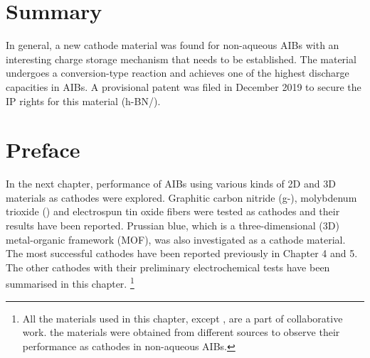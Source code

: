 \section{Summary}
In general, a new cathode material was found for non-aqueous AIBs with an interesting charge storage mechanism that needs to be established. The material undergoes a conversion-type reaction and achieves one of the highest discharge capacities in AIBs. A provisional patent was filed in December 2019 to secure the IP rights for this material (h-BN/).
\newpage
\section*{Preface}
In the next chapter, performance of AIBs using various kinds of 2D and 3D materials as cathodes were explored. Graphitic carbon nitride (g-), molybdenum trioxide () and electrospun tin oxide  fibers were tested as cathodes and their results have been reported. Prussian blue, which is a three-dimensional (3D) metal-organic framework (MOF), was also investigated as a cathode material. The most successful cathodes have been reported previously in Chapter 4 and 5. The other cathodes with their preliminary electrochemical tests have been summarised in this chapter. \footnote{All the materials used in this chapter, except , are a part of collaborative work. the  materials were obtained from different sources to observe their performance as cathodes in non-aqueous AIBs.}
  
